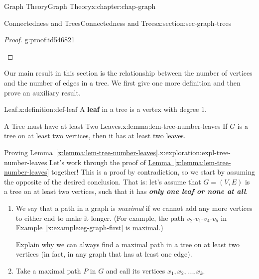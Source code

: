 \documentclass[oneside,10pt,]{book}
\newcommand{\xreffont}{\relax}
\newcommand{\alert}[1]{\textbf{\textit{#1}}}
\newcommand{\terminology}[1]{\textbf{#1}}
\numberwithin{equation}{section}
\begin{document}
\begin{chapterptx}{Graph Theory}{}{Graph Theory}{}{}{x:chapter:chap-graph}
\begin{sectionptx}{Connectedness and Trees}{}{Connectedness and Trees}{}{}{x:section:sec-graph-trees}
\begin{proof}{}{g:proof:id546821}
\begin{sidebyside}{2}{0}{0}{0.07}
\begin{sbspanel}{0.18}
{
}%
\end{sbspanel}%
\end{sidebyside}%
\end{proof}
Our main result in this section is the relationship between the number of vertices and the number of edges in a tree. We first give one more definition and then prove an auxiliary result.%
\begin{definition}{Leaf.}{x:definition:def-leaf}%
A \terminology{leaf} in a tree is a vertex with degree 1.%
\end{definition}
\begin{lemma}{A Tree must have at least Two Leaves.}{}{x:lemma:lem-tree-number-leaves}%
If \(G\) is a tree on at least two vertices, then it has at least two leaves.%
\end{lemma}
\begin{exploration}{Proving Lemma~{\xreffont\ref*{x:lemma:lem-tree-number-leaves}}.}{x:exploration:expl-tree-number-leaves}%
Let's work through the proof of \hyperref[x:lemma:lem-tree-number-leaves]{Lemma~{\xreffont\ref{x:lemma:lem-tree-number-leaves}}} together! This is a proof by contradiction, so we start by assuming the opposite of the desired conclusion. That is: let's assume that \(G = (V,E)\) is a tree on at least two vertices, such that it has \alert{only one leaf or none at all}.%
\begin{enumerate}[font=\bfseries,label=(\alph*),ref=\alph*]
\item{}We say that a path in a graph is \emph{maximal} if we cannot add any more vertices to either end to make it longer. (For example, the path \(v_2\)-\(v_1\)-\(v_4\)-\(v_5\) in \hyperref[x:example:eg-graph-first]{Example~{\xreffont\ref{x:example:eg-graph-first}}} is maximal.)%
\par
Explain why we can always find a maximal path in a tree on at least two vertices (in fact, in any graph that has at least one edge).%
\item{}Take a maximal path \(P\) in \(G\) and call its vertices \(x_1,x_2,\ldots,x_k\).%
\begin{sidebyside}{1}{0.3}{0.3}{0}%

\end{sidebyside}
\end{enumerate}
\end{exploration}
\end{sectionptx}
\end{chapterptx}
\end{document}
